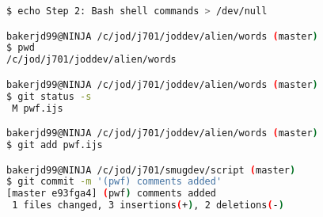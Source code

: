 \begin{enumerate}
\begin{lstlisting}[language=bash,frame=single,framerule=0pt
,basicstyle=\ttfamily\footnotesize,backgroundcolor=\color{CodeBackGround}]
$ echo Step 2: Bash shell commands > /dev/null

bakerjd99@NINJA /c/jod/j701/joddev/alien/words (master)
$ pwd
/c/jod/j701/joddev/alien/words

bakerjd99@NINJA /c/jod/j701/joddev/alien/words (master)
$ git status -s
 M pwf.ijs

bakerjd99@NINJA /c/jod/j701/joddev/alien/words (master)
$ git add pwf.ijs

bakerjd99@NINJA /c/jod/j701/smugdev/script (master)
$ git commit -m '(pwf) comments added'
[master e93fga4] (pwf) comments added
 1 files changed, 3 insertions(+), 2 deletions(-)
\end{lstlisting}







\end{enumerate}  